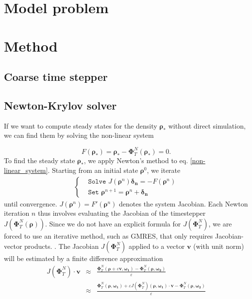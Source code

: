 \documentclass[]{article}
\newcommand{\R}{\ensuremath{\mathbb{R}}} %
\newcommand{\U}{\ensuremath{\boldsymbol{\rho}}}
\newcommand{\cts}{\ensuremath{\boldsymbol{\Phi}^N_T}} %
\theoremstyle{definition}
\begin{document}
 
\section{Model problem}





\section{Method}
\subsection{Coarse time stepper}



\subsection{Newton-Krylov solver} \label{sec:Newton-Krylov}


If we want to compute steady states for the density $\U_*$ without direct simulation, we can find them by solving the non-linear system

\begin{equation}
  {F}(\U_*) = \U_* - \cts(\U_*) =0. \label{non-linear_system}
\end{equation}
To find the steady state $\U_*$, we apply Newton's method to eq. \ref{non-linear_system}. Starting from an initial state $\U^0$, we iterate %
\begin{eqnarray}
\begin{cases}
& \texttt{Solve         }  J(\U^n) \boldsymbol{\delta_n}  =  - {F}(\U^n) \label{linear_system}        \\          
& \texttt{Set     } \U^{n+1} = \U^n+ \boldsymbol{\delta_n} 
\end{cases}
\end{eqnarray}
until convergence. 
$J(\U^n) =   F'(\U^n)  $ denotes the system Jacobian. Each Newton iteration $n$ thus involves evaluating the Jacobian of the timestepper $J(\cts(\U))$.
Since we do not have an explicit formula for $J(\cts)$, we are forced to use an iterative method, such as GMRES, that only requires Jacobian-vector products. %
 \cite{Brown_Krylov}.
The Jacobian $J(\cts)$ applied to a vector $\mathbf{v}$ (with unit norm) will be estimated by a finite difference approximation
\begin{eqnarray}
\label{Jv_approx}
J(\cts) \cdot \mathbf{v} &\approx& \frac{\cts (\U + \varepsilon \mathbf{v}, \boldsymbol{\omega_1} )  - \cts (\U, \boldsymbol{\omega_2})}{\varepsilon} \\
&\approx & \frac{\cts (\U, \boldsymbol{\omega_1} )  + \varepsilon J(\cts) (  \U, \boldsymbol{\omega_1})  \cdot \mathbf{v}  - \cts (\U, \boldsymbol{\omega_2}) }{\varepsilon} \nonumber
\end{eqnarray}
\end{document}
